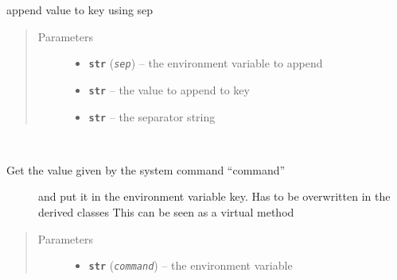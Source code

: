 \documentclass[a4paper,10pt,english]{sphinxmanual}
\begin{document}
\begin{fulllineitems}
\begin{fulllineitems}
\begin{quote}
\begin{description}
\end{description}\end{quote}

\end{fulllineitems}


\begin{fulllineitems}
\label{commands/apidoc/src:src.fileEnviron.ContextFileEnviron.append_value}
append value to key using sep
\begin{quote}\begin{description}
\item[{Parameters}] \leavevmode\begin{itemize}
\item {} 
\textbf{\texttt{str}} (\emph{\texttt{sep}}) -- the environment variable to append

\item {} 
\textbf{\texttt{str}} -- the value to append to key

\item {} 
\textbf{\texttt{str}} -- the separator string

\end{itemize}

\end{description}\end{quote}

\end{fulllineitems}


\begin{fulllineitems}
\label{commands/apidoc/src:src.fileEnviron.ContextFileEnviron.command_value}~\begin{description}
\item[{Get the value given by the system command ``command'' }] \leavevmode
and put it in the environment variable key.
Has to be overwritten in the derived classes
This can be seen as a virtual method

\end{description}
\begin{quote}\begin{description}
\item[{Parameters}] \leavevmode\begin{itemize}
\item {} 
\textbf{\texttt{str}} (\emph{\texttt{command}}) -- the environment variable


\end{itemize}
\end{description}
\end{quote}
\end{fulllineitems}
\end{fulllineitems}
\end{document}
